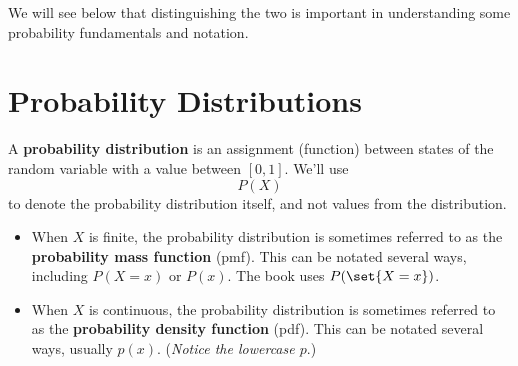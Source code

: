 \documentclass[10pt, leqno]{exam}
\begin{document}
    \medskip

    We will see below that distinguishing the two is important in understanding
    some probability fundamentals and notation.

    \section{Probability Distributions}

    A \textbf{probability distribution} is an assignment (function)
    between states of the random variable with a value between $[0, 1]$.
    We'll use
    $$P(X)$$
    to denote the probability distribution itself, and not values from
    the distribution.
    \begin{itemize}
    \item When $X$ is finite, the probability distribution is sometimes
    referred to as the \textbf{probability mass function} (pmf). This can
    be notated several ways, including $P(X = x)$ or $P(x)$. The book
    uses $P(\set{X = x})$.
    \item When $X$ is continuous, the probability distribution is sometimes
    referred to as the \textbf{probability density function} (pdf). This
    can be notated several ways, usually $p(x)$. (\textit{Notice the lowercase
    $p$}.)
    \end{itemize}
\end{document}
